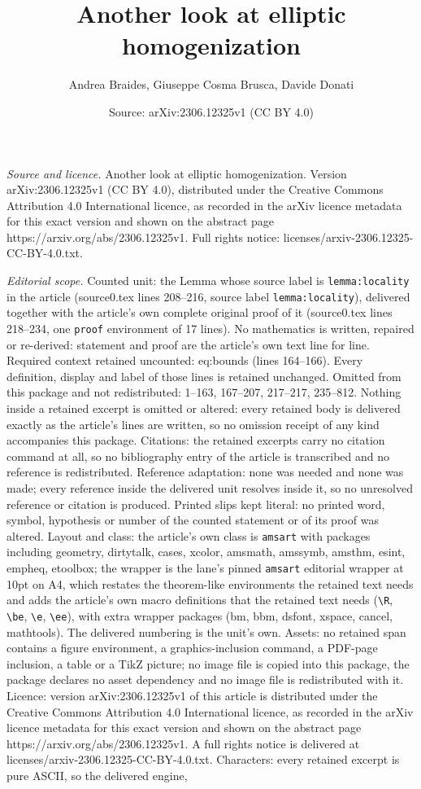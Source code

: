 \documentclass[10pt,a4paper]{amsart}
\title[Another look at elliptic homogenization]{Another look at elliptic homogenization}
\author{Andrea Braides, Giuseppe Cosma Brusca, Davide Donati}
\date{Source: arXiv:2306.12325v1 (CC BY 4.0)}
\begin{document}
\maketitle

\noindent\emph{Source and licence.} Another look at elliptic homogenization. Version arXiv:2306.12325v1 (CC BY 4.0), distributed under the Creative Commons Attribution 4.0 International licence, as recorded in the arXiv licence metadata for this exact version and shown on the abstract page https://arxiv.org/abs/2306.12325v1. Full rights notice: licenses/arxiv-2306.12325-CC-BY-4.0.txt.\par\smallskip

\noindent\textit{Editorial scope.} Counted unit: the Lemma whose source label is \texttt{lemma:locality} in the article (source0.tex lines 208--216, source label \texttt{lemma:locality}), delivered together with the article's own complete original proof of it (source0.tex lines 218--234, one \texttt{proof} environment of 17 lines). No mathematics is written, repaired or re-derived: statement and proof are the article's own text line for line. Required context retained uncounted: eq:bounds (lines 164--166). Every definition, display and label of those lines is retained unchanged. Omitted from this package and not redistributed: 1--163, 167--207, 217--217, 235--812. Nothing inside a retained excerpt is omitted or altered: every retained body is delivered exactly as the article's lines are written, so no omission receipt of any kind accompanies this package. Citations: the retained excerpts carry no citation command at all, so no bibliography entry of the article is transcribed and no reference is redistributed. Reference adaptation: none was needed and none was made; every reference inside the delivered unit resolves inside it, so no unresolved reference or citation is produced. Printed slips kept literal: no printed word, symbol, hypothesis or number of the counted statement or of its proof was altered. Layout and class: the article's own class is \texttt{amsart} with packages including geometry, dirtytalk, cases, xcolor, amsmath, amssymb, amsthm, esint, empheq, etoolbox; the wrapper is the lane's pinned \texttt{amsart} editorial wrapper at 10pt on A4, which restates the theorem-like environments the retained text needs and adds the article's own macro definitions that the retained text needs (\texttt{\textbackslash R}, \texttt{\textbackslash be}, \texttt{\textbackslash e}, \texttt{\textbackslash ee}), with extra wrapper packages (bm, bbm, dsfont, xspace, cancel, mathtools). The delivered numbering is the unit's own. Assets: no retained span contains a figure environment, a graphics-inclusion command, a PDF-page inclusion, a table or a TikZ picture; no image file is copied into this package, the package declares no asset dependency and no image file is redistributed with it. Licence: version arXiv:2306.12325v1 of this article is distributed under the Creative Commons Attribution 4.0 International licence, as recorded in the arXiv licence metadata for this exact version and shown on the abstract page https://arxiv.org/abs/2306.12325v1. A full rights notice is delivered at licenses/arxiv-2306.12325-CC-BY-4.0.txt. Characters: every retained excerpt is pure ASCII, so the delivered engine, 
\end{document}
